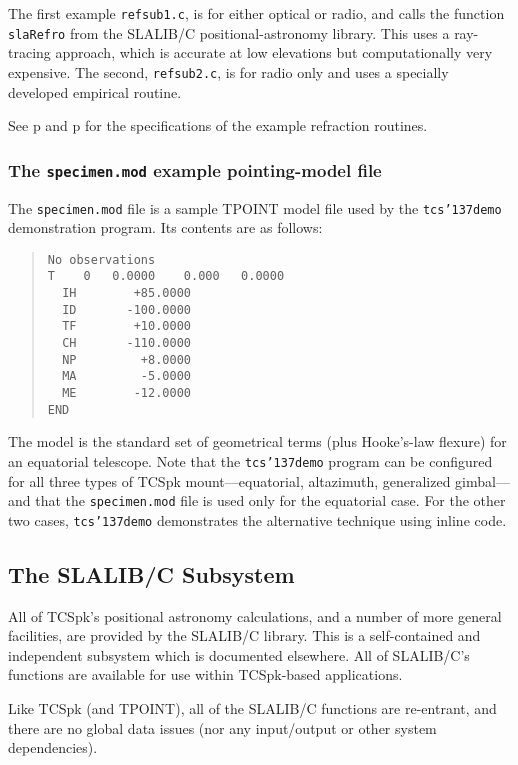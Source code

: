 \documentclass[12pt,fleqn,twoside]{article}
\renewcommand{\_}{{\tt\char'137}}     %
\begin{document}
The first example
{\tt refsub1.c}, is for either optical or radio, and calls the function
{\tt slaRefro} from the
SLALIB/C positional-astronomy library.  This uses
a ray-tracing approach, which is accurate
at low elevations but computationally very expensive.  The second,
{\tt refsub2.c}, is for radio only and
uses a specially developed empirical routine.

See p\pageref{dsaRefsub} and p\pageref{tcsRefsub} for the
specifications of the example refraction routines.

\subsubsection{The {\tt specimen.mod} example pointing-model file}
\label{specimendotmod}

The {\tt specimen.mod} file is a sample TPOINT model file used by the
{\tt tcs\_demo} demonstration program.  Its contents are as follows:
\begin{quote}
\begin{small}
\begin{verbatim}
No observations
T    0   0.0000    0.000   0.0000
  IH        +85.0000
  ID       -100.0000
  TF        +10.0000
  CH       -110.0000
  NP         +8.0000
  MA         -5.0000
  ME        -12.0000
END
\end{verbatim}\end{small}
\end{quote}
The model is the standard set of geometrical terms (plus Hooke's-law
flexure) for an equatorial telescope.  Note that the {\tt tcs\_demo}
program can be configured for all three types of TCSpk
mount---equatorial, altazimuth, generalized gimbal---and that
the {\tt specimen.mod} file is used only for the equatorial case.
For the other two cases, {\tt tcs\_demo} demonstrates the alternative
technique using inline code.

\ifx\vdoc\vfull
\newpage
\fi
\subsection{The SLALIB/C Subsystem}
\label{slalib}

All of TCSpk's positional astronomy calculations, and a number
of more general facilities, are provided by the SLALIB/C library.
This is a self-contained and independent subsystem which is
documented elsewhere.  All of SLALIB/C's functions are available
for use within TCSpk-based applications.

Like TCSpk (and TPOINT), all of the SLALIB/C functions are
re-entrant, and there are no global data issues (nor any input/output or
other system dependencies).
\end{document}
